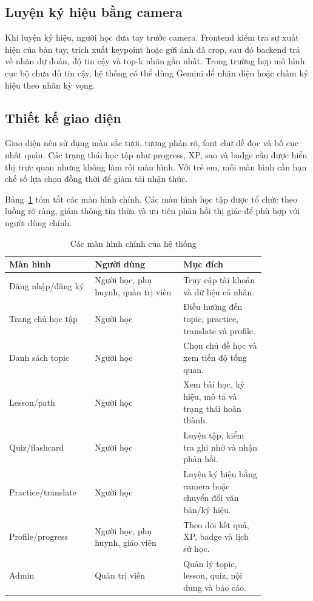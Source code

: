 \documentclass[conference]{IEEEtran}
\begin{document}
\subsection{Luyện ký hiệu bằng camera}
Khi luyện ký hiệu, người học đưa tay trước camera. Frontend kiểm tra sự xuất hiện của bàn tay, trích xuất keypoint hoặc gửi ảnh đã crop, sau đó backend trả về nhãn dự đoán, độ tin cậy và top-k nhãn gần nhất. Trong trường hợp mô hình cục bộ chưa đủ tin cậy, hệ thống có thể dùng Gemini để nhận diện hoặc chấm ký hiệu theo nhãn kỳ vọng.

\subsection{Thiết kế giao diện}
Giao diện nên sử dụng màu sắc tươi, tương phản rõ, font chữ dễ đọc và bố cục nhất quán. Các trạng thái học tập như progress, XP, sao và badge cần được hiển thị trực quan nhưng không làm rối màn hình. Với trẻ em, mỗi màn hình cần hạn chế số lựa chọn đồng thời để giảm tải nhận thức.

Bảng~\ref{tab:screens} tóm tắt các màn hình chính. Các màn hình học tập được tổ chức theo luồng rõ ràng, giảm thông tin thừa và ưu tiên phản hồi thị giác để phù hợp với người dùng chính.

\begin{table}[htbp]
\caption{Các màn hình chính của hệ thống}
\begin{center}
\footnotesize
\begin{tabular}{|p{0.26\linewidth}|p{0.30\linewidth}|p{0.28\linewidth}|}
\hline
\textbf{Màn hình} & \textbf{Người dùng} & \textbf{Mục đích} \\
\hline
Đăng nhập/đăng ký & Người học, phụ huynh, quản trị viên & Truy cập tài khoản và dữ liệu cá nhân. \\
\hline
Trang chủ học tập & Người học & Điều hướng đến topic, practice, translate và profile. \\
\hline
Danh sách topic & Người học & Chọn chủ đề học và xem tiến độ tổng quan. \\
\hline
Lesson/path & Người học & Xem bài học, ký hiệu, mô tả và trạng thái hoàn thành. \\
\hline
Quiz/flashcard & Người học & Luyện tập, kiểm tra ghi nhớ và nhận phản hồi. \\
\hline
Practice/translate & Người học & Luyện ký hiệu bằng camera hoặc chuyển đổi văn bản/ký hiệu. \\
\hline
Profile/progress & Người học, phụ huynh, giáo viên & Theo dõi kết quả, XP, badge và lịch sử học. \\
\hline
Admin & Quản trị viên & Quản lý topic, lesson, quiz, nội dung và báo cáo. \\
\hline
\end{tabular}
\label{tab:screens}
\end{center}
\end{table}
\end{document}
